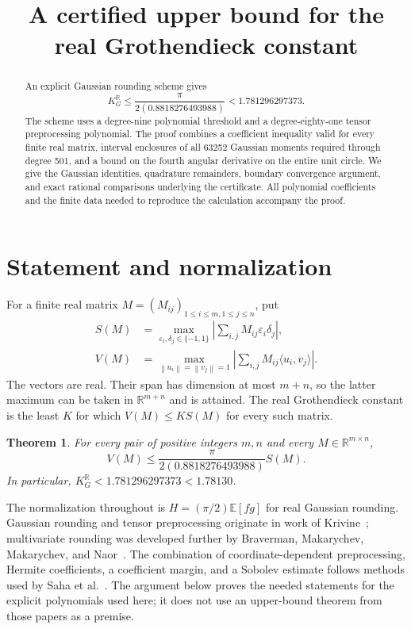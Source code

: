 \documentclass[11pt]{article}
\title{A certified upper bound for the real Grothendieck constant}
\author{}
\date{}
\newtheorem{theorem}{Theorem}
\theoremstyle{definition}\newtheorem{definition}[theorem]{Definition}
\newcommand{\R}{\mathbb R}
\newcommand{\E}{\mathbb E}
\newcommand{\norm}[1]{\left\lVert#1\right\rVert}
\newcommand{\abs}[1]{\left\lvert#1\right\rvert}
\begin{document}
\maketitle
\begin{abstract}
An explicit Gaussian rounding scheme gives
\[
 K_G^{\R}\leq \frac{\pi}{2(0.8818276493988)}
 <1.781296297373.
\]
The scheme uses a degree-nine polynomial threshold and a degree-eighty-one
tensor preprocessing polynomial. The proof combines a coefficient inequality
valid for every finite real matrix, interval enclosures of all 63252 Gaussian
moments required through degree 501, and a bound on the fourth angular
derivative on the entire unit circle. We give the Gaussian identities,
quadrature remainders, boundary convergence argument, and exact rational
comparisons underlying the certificate. All polynomial coefficients and the
finite data needed to reproduce the calculation accompany the proof.
\end{abstract}

\section{Statement and normalization}
For a finite real matrix $M=(M_{ij})_{1\leq i\leq m,1\leq j\leq n}$, put
\begin{align*}
 S(M)&=\max_{\varepsilon_i,\delta_j\in\{-1,1\}}
       \abs{\sum_{i,j}M_{ij}\varepsilon_i\delta_j},\\
 V(M)&=\max_{\norm{u_i}=\norm{v_j}=1}
       \abs{\sum_{i,j}M_{ij}\langle u_i,v_j\rangle}.
\end{align*}
The vectors are real. Their span has dimension at most $m+n$, so the latter
maximum can be taken in $\R^{m+n}$ and is attained. The real Grothendieck
constant is the least $K$ for which $V(M)\leq K S(M)$ for every such matrix.

\begin{theorem}\label{thm:main}
For every pair of positive integers $m,n$ and every $M\in\R^{m\times n}$,
\[
 V(M)\leq\frac{\pi}{2(0.8818276493988)}S(M).
\]
In particular, $K_G^{\R}<1.781296297373<1.78130$.
\end{theorem}

The normalization throughout is $H=(\pi/2)\E[fg]$ for real Gaussian
rounding. Gaussian rounding and tensor preprocessing originate in work of
Krivine~\cite{krivine}; multivariate rounding was developed further by
Braverman, Makarychev, Makarychev, and Naor~\cite{bmmn}. The combination of
coordinate-dependent preprocessing, Hermite coefficients, a coefficient
margin, and a Sobolev estimate follows methods used by Saha et
al.~\cite{saha}. The argument below proves the needed statements for the
explicit polynomials used here; it does not use an upper-bound theorem from
those papers as a premise.
\end{document}
